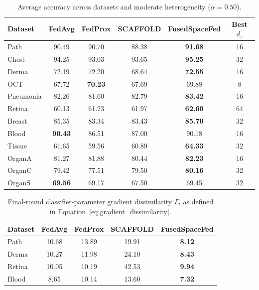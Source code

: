 \documentclass[twoside]{article}
\theoremstyle{thmstyleone}%
\theoremstyle{thmstyletwo}%
\theoremstyle{thmstylethree}%
\begin{document}
\begin{table}[t]
\centering
\caption{Average accuracy across datasets and moderate heterogeneity ($\alpha=0.50$).}
\label{tab:performance_1}
\begin{tabular}{lccccc}
\toprule
Dataset & FedAvg & FedProx & SCAFFOLD & \textbf{FusedSpaceFed} & Best $d_z$ \\
\midrule
Path      & 90.49 & 90.70 & 88.38 & \textbf{91.68} & 16 \\
Chest     & 94.25 & 93.03 & 93.65 & \textbf{95.25} & 32 \\
Derma     & 72.19 & 72.20 & 68.64 & \textbf{72.55} & 16 \\
OCT       & 67.72 & \textbf{70.23} & 67.69 & 69.88 & 8 \\
Pneumonia & 82.26 & 81.60 & 82.79 & \textbf{83.42} & 16 \\
Retina    & 60.13 & 61.23 & 61.97 & \textbf{62.60} & 64 \\
Breast    & 85.35 & 83.34 & 83.43 & \textbf{85.70} & 32 \\
Blood     & \textbf{90.43} & 86.51 & 87.00 & 90.18 & 16 \\
Tissue    & 61.65 & 59.56 & 60.89 & \textbf{64.33} & 32 \\
OrganA    & 81.27 & 81.88 & 80.44 & \textbf{82.23} & 16 \\
OrganC    & 79.42 & 77.51 & 79.50 & \textbf{80.16} & 32 \\
OrganS    & \textbf{69.56} & 69.17 & 67.50 & 69.45 & 32 \\
\bottomrule
\end{tabular}
\end{table}


\begin{table}[t]
\centering
\caption{Final-round classifier-parameter gradient dissimilarity
$\Gamma_t$ as defined in Equation~\eqref{eq:gradient_dissimilarity}.}
\label{tab:gradient}
\small
\setlength{\tabcolsep}{2pt}
\begin{tabular}{@{}lcccc@{}}
\toprule
Dataset & FedAvg & FedProx & SCAFFOLD & \textbf{FusedSpaceFed} \\
\midrule
Path   & 10.68 & 13.89 & 19.91 & \textbf{8.12} \\
Derma  & 10.27 & 11.98 & 24.10 & \textbf{8.43} \\
Retina & 10.05 & 10.19 & 42.53 & \textbf{9.94} \\
Blood  & 8.65  & 10.14 & 13.60 & \textbf{7.32} \\
\bottomrule
\end{tabular}
\end{table}
\end{document}
